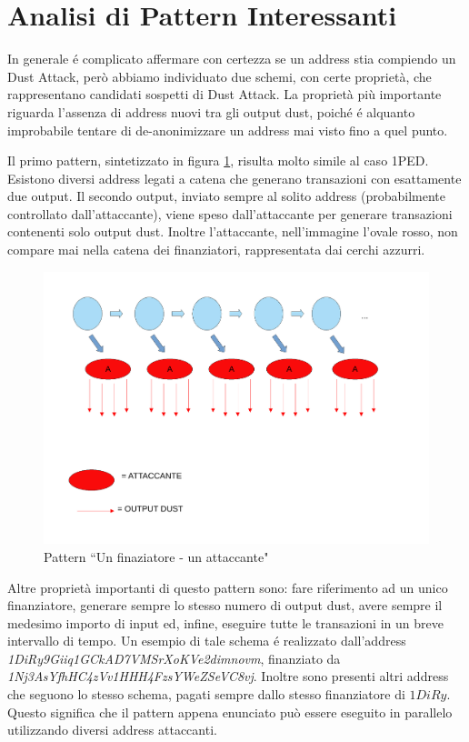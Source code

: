 \section{Analisi di Pattern Interessanti}\label{pattern}
In generale é complicato affermare con certezza se un address stia compiendo un Dust Attack, però abbiamo individuato due schemi, con certe proprietà, che rappresentano candidati sospetti di Dust Attack. La proprietà più importante riguarda l'assenza di address nuovi tra gli output dust, poiché é alquanto improbabile tentare di de-anonimizzare un address mai visto fino a quel punto.

Il primo pattern, sintetizzato in figura \ref{fig:schema1}, risulta molto simile al caso 1PED. Esistono diversi address legati a catena che generano transazioni con esattamente due output. Il secondo output, inviato sempre al solito address (probabilmente controllato dall'attaccante), viene speso dall'attaccante per generare transazioni contenenti solo output dust. Inoltre l'attaccante, nell'immagine l'ovale rosso, non compare mai nella catena dei finanziatori, rappresentata dai cerchi azzurri.
\begin{figure}[h!]
    \centering
    \includegraphics[scale=0.4]{Images/dust_attack1.pdf}
    \caption{Pattern ``Un finaziatore - un attaccante"}
    \label{fig:schema1}
\end{figure}
\FloatBarrier
Altre proprietà importanti di questo pattern sono: fare riferimento ad un unico finanziatore, generare sempre lo stesso numero di output dust, avere sempre il medesimo importo di input ed, infine, eseguire tutte le transazioni in un breve intervallo di tempo. Un esempio di tale schema é realizzato dall'address \textit{1DiRy9Giiq1GCkAD7VMSrXoKVe2dimnovm}, finanziato da \textit{1Nj3AsYfhHC4zVv1HHH4FzsYWeZSeVC8vj}. Inoltre sono presenti altri address che seguono lo stesso schema, pagati sempre dallo stesso finanziatore di $1DiRy$. Questo significa che il pattern appena enunciato può essere eseguito in parallelo utilizzando diversi address attaccanti.

